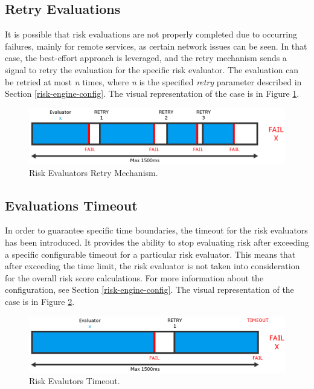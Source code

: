 \newpage

\subsection{Retry Evaluations} \label{impl-engine-retry}
It is possible that risk evaluations are not properly completed due to occurring failures, mainly for remote services, as certain network issues can be seen.
In that case, the best-effort approach is leveraged, and the retry mechanism sends a signal to retry the evaluation for the specific risk evaluator.
The evaluation can be retried at most \textit{n} times, where \textit{n} is the specified \textit{retry} parameter described in Section \ref{risk-engine-config}.
The visual representation of the case is in Figure \ref{fig:impl-risk-engine-retry}.

\begin{figure}[htbp]
  \centering
  \includegraphics[width=1\textwidth]{img/sections/6-implementation/async-retry.png}
  \caption{Risk Evaluators Retry Mechanism.}
  \label{fig:impl-risk-engine-retry}
\end{figure}

\newpage

\subsection{Evaluations Timeout} \label{impl-engine-timeout}
In order to guarantee specific time boundaries, the timeout for the risk evaluators has been introduced.
It provides the ability to stop evaluating risk after exceeding a specific configurable timeout for a particular risk evaluator.
This means that after exceeding the time limit, the risk evaluator is not taken into consideration for the overall risk score calculations.
For more information about the configuration, see Section \ref{risk-engine-config}.
The visual representation of the case is in Figure \ref{fig:impl-risk-engine-timeout}.

\begin{figure}[htbp]
  \centering
  \includegraphics[width=1\textwidth]{img/sections/6-implementation/async-timeout.png}
  \caption{Risk Evalutors Timeout.}
  \label{fig:impl-risk-engine-timeout}
\end{figure}

